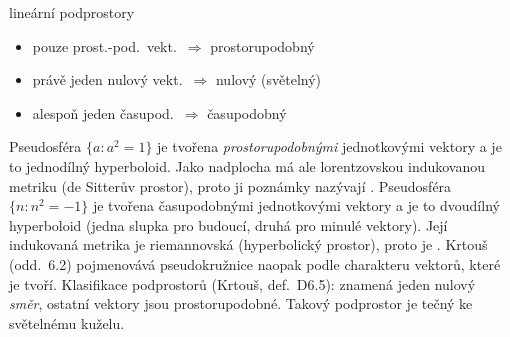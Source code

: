 lineární podprostory
\begin{itemize}[nosep]
  \item[] pouze prost.-pod.\ vekt.\ $\Rightarrow$ prostorupodobný
  \item[] právě jeden nulový vekt.\ $\Rightarrow$ nulový (světelný)
  \item[] alespoň jeden časupod.\ $\Rightarrow$ časupodobný
\end{itemize}

\begin{vysvetleni}
Pseudosféra $\{a: a^2=1\}$ je tvořena \emph{prostorupodobnými} jednotkovými vektory a je to jednodílný hyperboloid. Jako nadplocha má ale lorentzovskou indukovanou metriku (de Sitterův prostor), proto ji poznámky nazývají .
Pseudosféra $\{n: n^2=-1\}$ je tvořena časupodobnými jednotkovými vektory a je to dvoudílný hyperboloid (jedna slupka pro budoucí, druhá pro minulé vektory). Její indukovaná metrika je riemannovská (hyperbolický prostor), proto je .
Krtouš (odd.~6.2) pojmenovává pseudokružnice naopak podle charakteru vektorů, které je tvoří.
Klasifikace podprostorů (Krtouš, def.~D6.5):  znamená jeden nulový \emph{směr}, ostatní vektory jsou prostorupodobné. Takový podprostor je tečný ke světelnému kuželu.
\end{vysvetleni}



